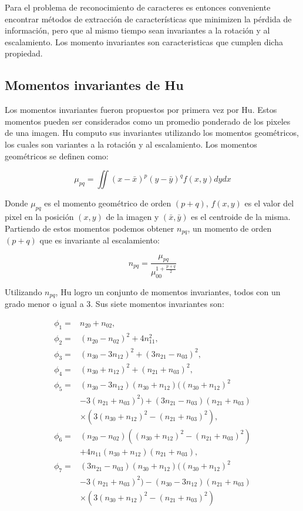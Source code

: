 \documentclass[a4paper, 11pt, oneside]{report}
\begin{document}
Para el problema de reconocimiento de caracteres es entonces conveniente encontrar métodos de extracción de características que minimizen la pérdida de información, pero que al mismo tiempo sean invariantes a la rotación y al escalamiento. Los momento invariantes son caracteristicas que cumplen dicha propiedad.

\subsection{Momentos invariantes de Hu}	
\label{sect:invariants}

Los momentos invariantes fueron propuestos por primera vez por Hu\cite{Hu62}. Estos momentos pueden ser considerados como un promedio ponderado de los pixeles de una imagen. Hu computo sus invariantes utilizando los momentos geométricos, los cuales son variantes a la rotación y al escalamiento. Los momentos geométricos se definen como:

	\begin{equation}\label{eq1}
		\mu_{pq} = \iint{ {(x-\bar{x})^p} {(y-\bar{y})^q} f(x,y) dy dx }
	\end{equation}

Donde $\mu_{pq}$ es el momento geométrico de orden $(p+q)$, $f(x,y)$ es el valor del pixel en la posición $(x,y)$ de la imagen y $(\bar{x},\bar{y})$ es el centroide de la misma. Partiendo de estos momentos podemos obtener $n_{pq}$, un momento de orden $(p+q)$ que es invariante al escalamiento:

	\begin{equation}\label{eq2}
		n_{pq} = \frac{\mu_{pq}}{ \mu_{00}^{1+\frac{p+q}{2}} }
	\end{equation}

Utilizando $n_{pq}$, Hu logro un conjunto de momentos invariantes, todos con un grado menor o igual a 3. Sus siete momentos invariantes son:

	\begin{align*}
		\phi_1 =& n_{20} + n_{02},\\
		\phi_2 =& (n_{20} - n_{02})^{2} + 4n_{11}^{2},\\
		\phi_3 =& (n_{30} - 3n_{12})^{2} + (3n_{21} - n_{03})^{2},\\
		\phi_4 =& (n_{30} + n_{12})^{2} + (n_{21} + n_{03})^{2},\\
		\phi_5 =& (n_{30} - 3n_{12})(n_{30} + n_{12})((n_{30} + n_{12})^{2}\\
				& - 3(n_{21} + n_{03})^{2}) + (3n_{21} - n_{03})(n_{21} + n_{03})\\
				& \times (3(n_{30} + n_{12})^{2} - (n_{21} + n_{03})^{2}),\\
		\phi_6 =& (n_{20} - n_{02})((n_{30} + n_{12})^{2} - (n_{21} + n_{03})^{2})\\
				& + 4n_{11}(n_{30} + n_{12})(n_{21} + n_{03}),\\
		\phi_7 =& (3n_{21} - n_{03})(n_{30} + n_{12})((n_{30} + n_{12})^{2}\\
				& - 3(n_{21} + n_{03})^{2}) - (n_{30} - 3n_{12})(n_{21} + n_{03})\\
				& \times (3(n_{30} + n_{12})^{2} - (n_{21} + n_{03})^{2})\\
	\end{align*}
\end{document}
